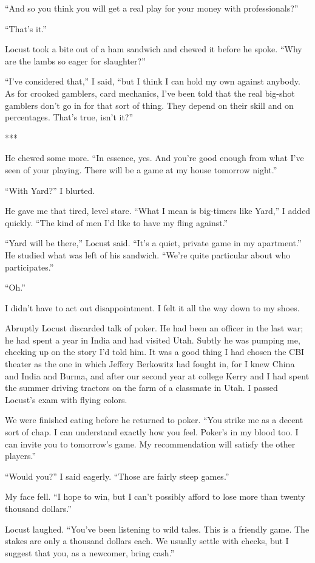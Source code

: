 \documentclass{novel}
\begin{document}
“And so you think you will get a real play for your money with professionals?”

“That’s it.”

Locust took a bite out of a ham sandwich and chewed it before he spoke. “Why are the lambs so eager for slaughter?”

“I’ve considered that,” I said, “but I think I can hold my own against anybody. As for crooked gamblers, card mechanics, I’ve been told that the real big-shot gamblers don’t go in for that sort of thing. They depend on their skill and on percentages. That’s true, isn’t it?”

***

He chewed some more. “In essence, yes. And you’re good enough from what I’ve seen of your playing. There will be a game at my house tomorrow night.”

“With Yard?” I blurted.

He gave me that tired, level stare. “What I mean is big-timers like Yard,” I added quickly. “The kind of men I’d like to have my fling against.”

“Yard will be there,” Locust said. “It’s a quiet, private game in my apartment.” He studied what was left of his sandwich. “We’re quite particular about who participates.”

“Oh.”

I didn’t have to act out disappointment. I felt it all the way down to my shoes.

Abruptly Locust discarded talk of poker. He had been an officer in the last war; he had spent a year in India and had visited Utah. Subtly he was pumping me, checking up on the story I’d told him. It was a good thing I had chosen the CBI theater as the one in which Jeffery Berkowitz had fought in, for I knew China and India and Burma, and after our second year at college Kerry and I had spent the summer driving tractors on the farm of a classmate in Utah. I passed Locust’s exam with flying colors.

We were finished eating before he returned to poker. “You strike me as a decent sort of chap. I can understand exactly how you feel. Poker’s in my blood too. I can invite you to tomorrow’s game. My recommendation will satisfy the other players.”

“Would you?” I said eagerly. “Those are fairly steep games.”

My face fell. “I hope to win, but I can’t possibly afford to lose more than twenty thousand dollars.”

Locust laughed. “You’ve been listening to wild tales. This is a friendly game. The stakes are only a thousand dollars each. We usually settle with checks, but I suggest that you, as a newcomer, bring cash.”
\end{document}

